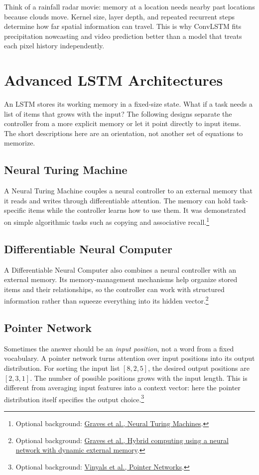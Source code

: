 \documentclass[11pt, oneside]{book}
\let\originalsection\section
\renewcommand{\section}{\Needspace{7\baselineskip}\originalsection}
\let\originalsubsection\subsection
\renewcommand{\subsection}{\Needspace{6\baselineskip}\originalsubsection}
\begin{document}
Think of a rainfall radar movie: memory at a location needs nearby past locations because clouds move. Kernel size, layer depth, and repeated recurrent steps determine how far spatial information can travel. This is why ConvLSTM fits precipitation nowcasting and video prediction better than a model that treats each pixel history independently.

\section{Advanced LSTM Architectures}\label{sec:source-3-7}
An LSTM stores its working memory in a fixed-size state. What if a task needs a list of items that grows with the input? The following designs separate the controller from a more explicit memory or let it point directly to input items. The short descriptions here are an orientation, not another set of equations to memorize.

\subsection{Neural Turing Machine}\label{sec:source-3-7-1}
A Neural Turing Machine couples a neural controller to an external memory that it reads and writes through differentiable attention. The memory can hold task-specific items while the controller learns how to use them. It was demonstrated on simple algorithmic tasks such as copying and associative recall.\footnote{Optional background: \href{https://arxiv.org/abs/1410.5401}{Graves et al., Neural Turing Machines}.}

\subsection{Differentiable Neural Computer}\label{sec:source-3-7-2}
A Differentiable Neural Computer also combines a neural controller with an external memory. Its memory-management mechanisms help organize stored items and their relationships, so the controller can work with structured information rather than squeeze everything into its hidden vector.\footnote{Optional background: \href{https://doi.org/10.1038/nature20101}{Graves et al., Hybrid computing using a neural network with dynamic external memory}.}

\subsection{Pointer Network}\label{sec:source-3-7-3}
Sometimes the answer should be an \emph{input position}, not a word from a fixed vocabulary. A pointer network turns attention over input positions into its output distribution. For sorting the input list $[8,2,5]$, the desired output positions are $[2,3,1]$. The number of possible positions grows with the input length. This is different from averaging input features into a context vector: here the pointer distribution itself specifies the output choice.\footnote{Optional background: \href{https://arxiv.org/abs/1506.03134}{Vinyals et al., Pointer Networks}.}
\end{document}
